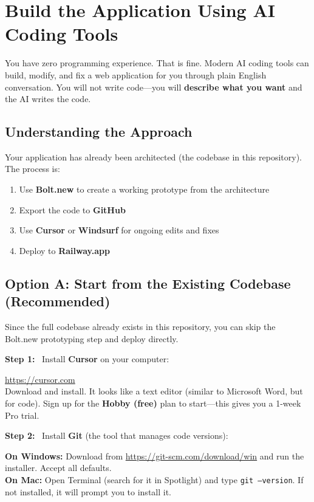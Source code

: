 \documentclass[12pt, letterpaper, oneside]{book}
\newcommand{\step}[1]{\noindent\textbf{\textcolor{primary}{Step #1:}}~}
\begin{document}
\chapter{Build the Application Using AI Coding Tools}

You have zero programming experience. That is fine. Modern AI coding tools can build, modify, and fix a web application for you through plain English conversation. You will not write code---you will \textbf{describe what you want} and the AI writes the code.

\section{Understanding the Approach}

Your application has already been architected (the codebase in this repository). The process is:

\begin{enumerate}[leftmargin=2em]
  \item Use \textbf{Bolt.new} to create a working prototype from the architecture
  \item Export the code to \textbf{GitHub}
  \item Use \textbf{Cursor} or \textbf{Windsurf} for ongoing edits and fixes
  \item Deploy to \textbf{Railway.app}
\end{enumerate}

\section{Option A: Start from the Existing Codebase (Recommended)}

Since the full codebase already exists in this repository, you can skip the Bolt.new prototyping step and deploy directly.

\step{1} Install \textbf{Cursor} on your computer:
\begin{actionbox}
\url{https://cursor.com}\\[4pt]
Download and install. It looks like a text editor (similar to Microsoft Word, but for code). Sign up for the \textbf{Hobby (free)} plan to start---this gives you a 1-week Pro trial.
\end{actionbox}

\step{2} Install \textbf{Git} (the tool that manages code versions):
\begin{actionbox}
\textbf{On Windows:} Download from \url{https://git-scm.com/download/win} and run the installer. Accept all defaults.\\[4pt]
\textbf{On Mac:} Open Terminal (search for it in Spotlight) and type \texttt{git --version}. If not installed, it will prompt you to install it.
\end{actionbox}
\end{document}
